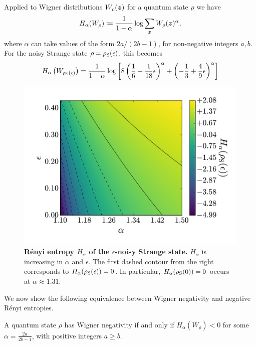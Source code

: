 \documentclass[pra,
aps,
twocolumn,
superscriptaddress,
groupedaddress,
nofootinbib,
reprint
]{revtex4-1}
\begin{document}
Applied to Wigner distributions $W_\rho (\boldsymbol{z})$ for a quantum state $\rho$ we have
\begin{equation}
	H_\alpha(W_\rho) \coloneqq \frac{1}{1-\alpha} \log \sum_{\bm{z}} W_{\rho}(\bm{z})^\alpha,
\end{equation}
where $\alpha$ can take values of the form $2a / (2b-1)$, for non-negative integers $a,b$. For the noisy Strange state $\rho = \rho_{\rm{S}}(\epsilon)$, this becomes
\begin{align}
	H_{\alpha}\left(W_{\rho_{\rm{S}}(\epsilon)}\right) = \frac{1}{1-\alpha}\log \left[ 8\left( \frac{1}{6} - \frac{1}{18}\epsilon \right)^\alpha + \left(-\frac{1}{3} + \frac{4}{9}\epsilon \right)^\alpha \right] \nonumber\\
\end{align}
\begin{figure}[t!]
    \centering
    \includegraphics[scale=0.35]{figs/H_vs_eps_a.pdf}
    \caption{\textbf{R\'{e}nyi entropy $H_\alpha$ of the $\epsilon$-noisy Strange state.} $H_\alpha$ is increasing in $\alpha$ and $\epsilon$. The first dashed contour from the right corresponds to $H_\alpha(\rho_{\rm{S}}(\epsilon)) = 0$. In particular, $H_\alpha(\rho_{\rm{S}}(0)) = 0$ occurs at $\alpha \approx 1.31$.
    }
    \label{fig:H}
\end{figure}
We now show the following equivalence between Wigner negativity and negative R\'{e}nyi entropies.
\begingroup
\def\thetheorem{\ref{thm:Magic}}
\begin{theorem}
	A quantum state $\rho$ has Wigner negativity if and only if $H_\alpha(W_\rho) < 0$ for some $\alpha =  \frac{2a}{2b-1}$, with positive integers $a \geq b$.
\end{theorem}
\end{document}
